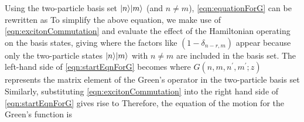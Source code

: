 Using the two-particle basis set $| n \rangle| m \rangle$ (and $n \neq m$), \autoref{eqn:equationForG} can be rewritten as
To simplify the above equation, we make use of \autoref{eqn:excitonCommutation} and evaluate the effect of the 
Hamiltonian operating on the basis states, giving
where the factors like $(1-\delta_{n-r, m})$ appear because only the two-particle states $| n \rangle| m \rangle$ with 
$n \neq m$ are included in the basis set. 
The left-hand side of \autoref{eqn:startEqnForG} becomes
where $G(n, m, n^{\prime}, m^{\prime}; z)$ represents the matrix element of the Green's operator in the two-particle 
basis set 
Similarly, substituting \autoref{eqn:excitonCommutation} into the right hand side of \autoref{eqn:startEqnForG}  gives
rise to 
Therefore, the equation of the motion for the Green's function is 
